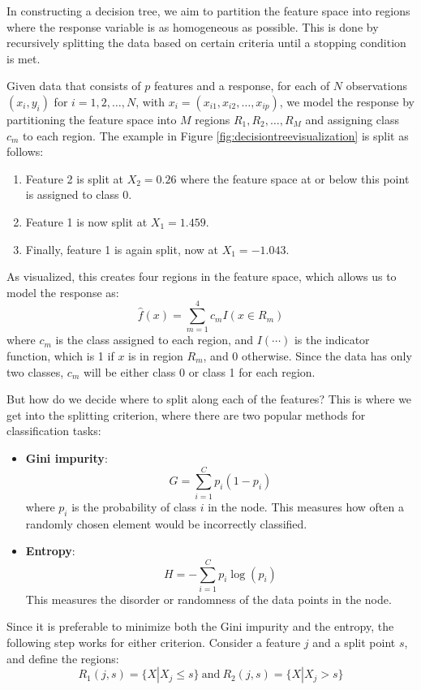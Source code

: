 \documentclass[english,11pt,a4paper,titlepage]{article}
\begin{document}
	In constructing a decision tree, we aim to partition the feature space into regions where the response variable is as homogeneous as possible. This is done by recursively splitting the data based on certain criteria until a stopping condition is met.
	
	Given data that consists of \( p \) features and a response, for each of \( N \) observations \((x_i, y_i)\) for \( i = 1, 2, \ldots, N \), with \( x_i = (x_{i1}, x_{i2}, \ldots, x_{ip}) \), we model the response by partitioning the feature space into \( M \) regions \( R_1, R_2, \ldots, R_M \) and assigning class \( c_m \) to each region. The example in Figure \ref{fig:decisiontreevisualization} is split as follows:	
	\begin{enumerate}
		\item Feature 2 is split at \(X_2 = 0.26\) where the feature space at or below this point is assigned to class 0.
		\item Feature 1 is now split at \(X_1 = 1.459\).
		\item Finally, feature 1 is again split, now at \(X_1 = -1.043\).
	\end{enumerate}
	
	As visualized, this creates four regions in the feature space, which allows us to model the response as:
	\begin{equation*}
		\hat{f}(x) = \sum_{m=1}^{4} c_m I(x \in R_m)
	\end{equation*}
	where \( c_m \) is the class assigned to each region, and \( I(\cdots) \) is the indicator function, which is 1 if \( x \) is in region \( R_m \), and 0 otherwise. Since the data has only two classes, \( c_m \) will be either class 0 or class 1 for each region.
	
	But how do we decide where to split along each of the features? This is where we get into the splitting criterion, where there are two popular methods for classification tasks:
	
	\begin{itemize}
		\item \textbf{Gini impurity}:
		\begin{equation*}
			G = \sum_{i=1}^{C}p_i(1-p_i)
		\end{equation*}
		where $p_i$ is the probability of class $i$ in the node. This measures how often a randomly chosen element would be incorrectly classified.
		\item \textbf{Entropy}:
		\begin{equation*}
			H = -\sum_{i=1}^{C}p_i\log(p_i)
		\end{equation*}
		This measures the disorder or randomness of the data points in the node.
	\end{itemize}
	Since it is preferable to minimize both the Gini impurity and the entropy, the following step works for either criterion. Consider a feature \( j \) and a split point \( s \), and define the regions:
	\begin{equation*}
		R_1(j, s) = \{X|X_j \leq s\}\ \text{and}\ R_2(j, s) = \{X|X_j > s\}
	\end{equation*}
	
\end{document}
